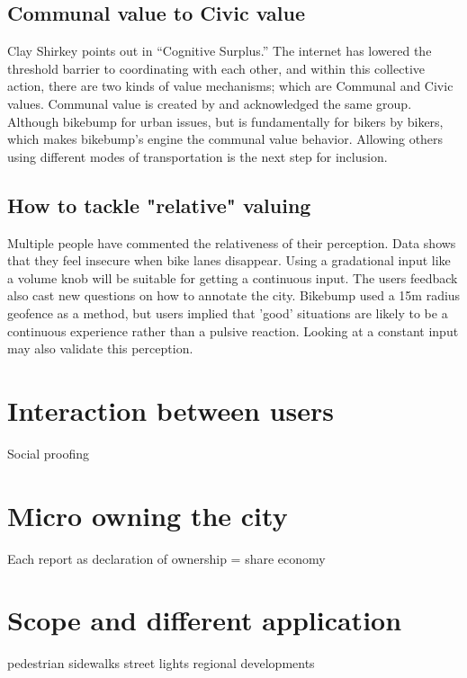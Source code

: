 \subsection{Communal value to Civic value}
Clay Shirkey points out in “Cognitive Surplus.” The internet has lowered the threshold barrier to coordinating with each other, and within this collective action, there are two kinds of value mechanisms; which are Communal and Civic values. Communal value is created by and acknowledged the same group. Although bikebump for urban issues, but is fundamentally for bikers by bikers, which makes bikebump's engine the communal value behavior. Allowing others using different modes of transportation is the next step for inclusion.

\subsection{How to tackle "relative" valuing}
Multiple people have commented the relativeness of their perception. Data shows that they feel insecure when bike lanes disappear. Using a gradational input like a volume knob will be suitable for getting a continuous input. The users feedback also cast new questions on how to annotate the city. Bikebump used a 15m radius geofence as a method, but users implied that 'good' situations are likely to be a continuous experience rather than a pulsive reaction. Looking at a constant input may also validate this perception.

\section{Interaction between users}
Social proofing
\section{Micro owning the city}
Each report as declaration of ownership = share economy
\section{Scope and different application}
pedestrian sidewalks
street lights
regional developments


